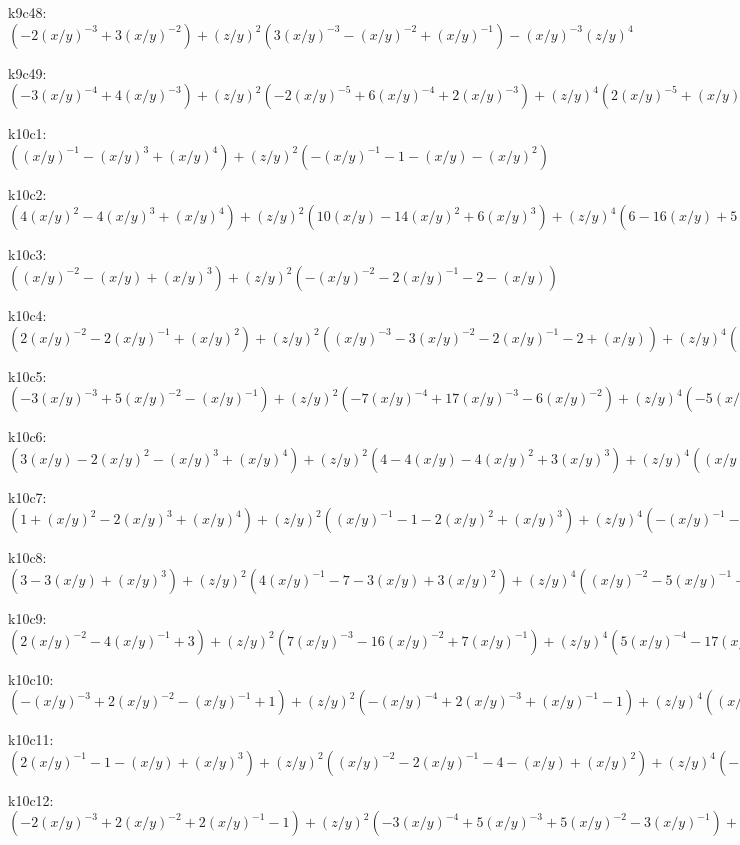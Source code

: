 k9c48: $ (-2(x/y)^{-3}+3(x/y)^{-2})  +(z/y)^{2}(3(x/y)^{-3}-(x/y)^{-2}+(x/y)^{-1})  -(x/y)^{-3}(z/y)^{4} $ 

k9c49: $ (-3(x/y)^{-4}+4(x/y)^{-3})  +(z/y)^{2}(-2(x/y)^{-5}+6(x/y)^{-4}+2(x/y)^{-3})  +(z/y)^{4}(2(x/y)^{-5}+(x/y)^{-4}) $ 

k10c1: $ ((x/y)^{-1}-(x/y)^{3}+(x/y)^{4})  +(z/y)^{2}(-(x/y)^{-1}-1-(x/y)-(x/y)^{2}) $ 

k10c2: $ (4(x/y)^{2}-4(x/y)^{3}+(x/y)^{4})  +(z/y)^{2}(10(x/y)-14(x/y)^{2}+6(x/y)^{3})  +(z/y)^{4}(6-16(x/y)+5(x/y)^{2})  +(z/y)^{6}((x/y)^{-1}-7+(x/y))  -(x/y)^{-1}(z/y)^{8} $ 

k10c3: $ ((x/y)^{-2}-(x/y)+(x/y)^{3})  +(z/y)^{2}(-(x/y)^{-2}-2(x/y)^{-1}-2-(x/y)) $ 

k10c4: $ (2(x/y)^{-2}-2(x/y)^{-1}+(x/y)^{2})  +(z/y)^{2}((x/y)^{-3}-3(x/y)^{-2}-2(x/y)^{-1}-2+(x/y))  +(z/y)^{4}(-(x/y)^{-3}-(x/y)^{-2}-(x/y)^{-1}) $ 

k10c5: $ (-3(x/y)^{-3}+5(x/y)^{-2}-(x/y)^{-1})  +(z/y)^{2}(-7(x/y)^{-4}+17(x/y)^{-3}-6(x/y)^{-2})  +(z/y)^{4}(-5(x/y)^{-5}+17(x/y)^{-4}-5(x/y)^{-3})  +(z/y)^{6}(-(x/y)^{-6}+7(x/y)^{-5}-(x/y)^{-4})  +(x/y)^{-6}(z/y)^{8} $ 

k10c6: $ (3(x/y)-2(x/y)^{2}-(x/y)^{3}+(x/y)^{4})  +(z/y)^{2}(4-4(x/y)-4(x/y)^{2}+3(x/y)^{3})  +(z/y)^{4}((x/y)^{-1}-4-4(x/y)+(x/y)^{2})  +(z/y)^{6}(-(x/y)^{-1}-1) $ 

k10c7: $ (1+(x/y)^{2}-2(x/y)^{3}+(x/y)^{4})  +(z/y)^{2}((x/y)^{-1}-1-2(x/y)^{2}+(x/y)^{3})  +(z/y)^{4}(-(x/y)^{-1}-1-(x/y)) $ 

k10c8: $ (3-3(x/y)+(x/y)^{3})  +(z/y)^{2}(4(x/y)^{-1}-7-3(x/y)+3(x/y)^{2})  +(z/y)^{4}((x/y)^{-2}-5(x/y)^{-1}-4+(x/y))  +(z/y)^{6}(-(x/y)^{-2}-(x/y)^{-1}) $ 

k10c9: $ (2(x/y)^{-2}-4(x/y)^{-1}+3)  +(z/y)^{2}(7(x/y)^{-3}-16(x/y)^{-2}+7(x/y)^{-1})  +(z/y)^{4}(5(x/y)^{-4}-17(x/y)^{-3}+5(x/y)^{-2})  +(z/y)^{6}((x/y)^{-5}-7(x/y)^{-4}+(x/y)^{-3})  -(x/y)^{-5}(z/y)^{8} $ 

k10c10: $ (-(x/y)^{-3}+2(x/y)^{-2}-(x/y)^{-1}+1)  +(z/y)^{2}(-(x/y)^{-4}+2(x/y)^{-3}+(x/y)^{-1}-1)  +(z/y)^{4}((x/y)^{-4}+(x/y)^{-3}+(x/y)^{-2}) $ 

k10c11: $ (2(x/y)^{-1}-1-(x/y)+(x/y)^{3})  +(z/y)^{2}((x/y)^{-2}-2(x/y)^{-1}-4-(x/y)+(x/y)^{2})  +(z/y)^{4}(-(x/y)^{-2}-2(x/y)^{-1}-1) $ 

k10c12: $ (-2(x/y)^{-3}+2(x/y)^{-2}+2(x/y)^{-1}-1)  +(z/y)^{2}(-3(x/y)^{-4}+5(x/y)^{-3}+5(x/y)^{-2}-3(x/y)^{-1})  +(z/y)^{4}(-(x/y)^{-5}+4(x/y)^{-4}+4(x/y)^{-3}-(x/y)^{-2})  +(z/y)^{6}((x/y)^{-5}+(x/y)^{-4}) $ 

